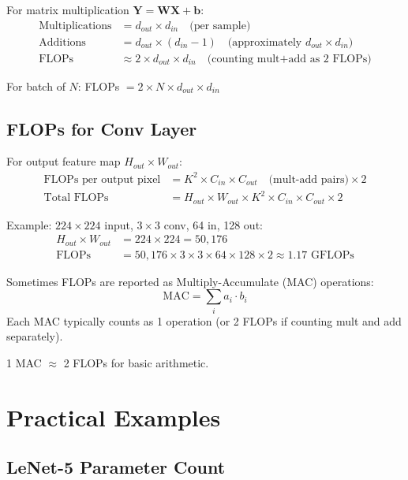 For matrix multiplication $\mathbf{Y} = \mathbf{W}\mathbf{X} + \mathbf{b}$:
\begin{align}
\text{Multiplications} &= d_{out} \times d_{in} \quad \text{(per sample)} \\
\text{Additions} &= d_{out} \times (d_{in} - 1) \quad \text{(approximately } d_{out} \times d_{in}) \\
\text{FLOPs} &\approx 2 \times d_{out} \times d_{in} \quad \text{(counting mult+add as 2 FLOPs)}
\end{align}

For batch of $N$: FLOPs $= 2 \times N \times d_{out} \times d_{in}$

\subsection{FLOPs for Conv Layer}

For output feature map $H_{out} \times W_{out}$:
\begin{align}
\text{FLOPs per output pixel} &= K^2 \times C_{in} \times C_{out} \quad \text{(mult-add pairs)} \times 2 \\
\text{Total FLOPs} &= H_{out} \times W_{out} \times K^2 \times C_{in} \times C_{out} \times 2
\end{align}

Example: $224\times224$ input, $3\times3$ conv, 64 in, 128 out:
\begin{align}
H_{out} \times W_{out} &= 224 \times 224 = 50,176 \\
\text{FLOPs} &= 50,176 \times 3 \times 3 \times 64 \times 128 \times 2 \approx 1.17 \text{ GFLOPs}
\end{align}

\begin{note}
Sometimes FLOPs are reported as Multiply-Accumulate (MAC) operations:
\begin{equation}
\text{MAC} = \sum_{i} a_i \cdot b_i
\end{equation}
Each MAC typically counts as 1 operation (or 2 FLOPs if counting mult and add separately).

1 MAC $\approx$ 2 FLOPs for basic arithmetic.
\end{note}

\section{Practical Examples}

\subsection{LeNet-5 Parameter Count}

